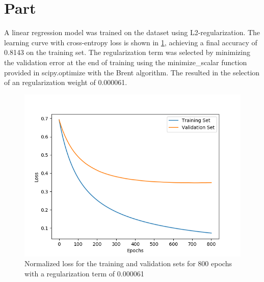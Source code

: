 \documentclass{article}
\newcommand{\enterproblemHeader}[1]{
}
\newcommand{\exitproblemHeader}[1]{
}
\newcounter{problem} %
\newcommand{\problemName}{}
\newenvironment{problem}[1][Part \theproblem]{ %
	\stepcounter{problem} %
	\renewcommand{\problemName}{#1} %
	\section{\problemName} %
	\enterproblemHeader{\problemName} %
}{
	\exitproblemHeader{\problemName} %
}
\begin{document}

\FloatBarrier
\begin{problem}
	
	A linear regression model was trained on the dataset using L2-regularization. The learning curve with cross-entropy loss is shown in \cref{fig:q4}, achieving a final accuracy of 0.8143 on the training set. The regularization term was selected by minimizing the validation error at the end of training using the minimize\_scalar function provided in scipy.optimize with the Brent algorithm. The resulted in the selection of an regularization weight of 0.000061.
	
	\begin{figure}
		\includegraphics[width=\linewidth]{q4}
		\caption{Normalized loss for the training and validation sets for 800 epochs with a regularization term of 0.000061}
		\label{fig:q4}
	\end{figure}
	
\end{problem}
\clearpage

\end{document}

